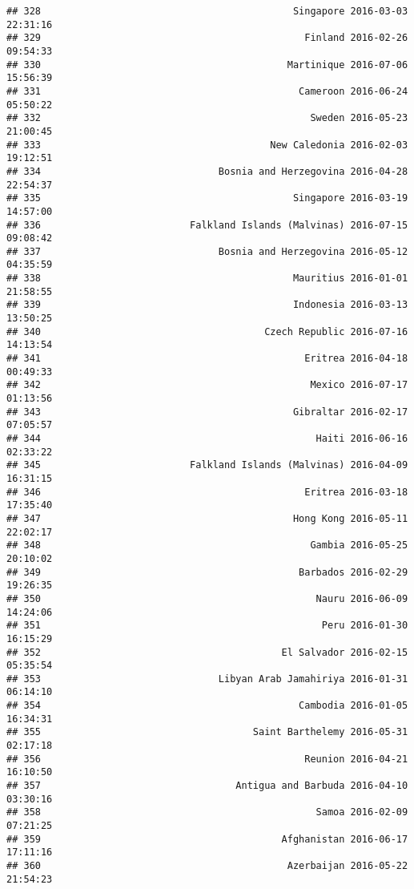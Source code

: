 \documentclass[
]{article}
\begin{document}
\begin{verbatim}
## 328                                            Singapore 2016-03-03 22:31:16
## 329                                              Finland 2016-02-26 09:54:33
## 330                                           Martinique 2016-07-06 15:56:39
## 331                                             Cameroon 2016-06-24 05:50:22
## 332                                               Sweden 2016-05-23 21:00:45
## 333                                        New Caledonia 2016-02-03 19:12:51
## 334                               Bosnia and Herzegovina 2016-04-28 22:54:37
## 335                                            Singapore 2016-03-19 14:57:00
## 336                          Falkland Islands (Malvinas) 2016-07-15 09:08:42
## 337                               Bosnia and Herzegovina 2016-05-12 04:35:59
## 338                                            Mauritius 2016-01-01 21:58:55
## 339                                            Indonesia 2016-03-13 13:50:25
## 340                                       Czech Republic 2016-07-16 14:13:54
## 341                                              Eritrea 2016-04-18 00:49:33
## 342                                               Mexico 2016-07-17 01:13:56
## 343                                            Gibraltar 2016-02-17 07:05:57
## 344                                                Haiti 2016-06-16 02:33:22
## 345                          Falkland Islands (Malvinas) 2016-04-09 16:31:15
## 346                                              Eritrea 2016-03-18 17:35:40
## 347                                            Hong Kong 2016-05-11 22:02:17
## 348                                               Gambia 2016-05-25 20:10:02
## 349                                             Barbados 2016-02-29 19:26:35
## 350                                                Nauru 2016-06-09 14:24:06
## 351                                                 Peru 2016-01-30 16:15:29
## 352                                          El Salvador 2016-02-15 05:35:54
## 353                               Libyan Arab Jamahiriya 2016-01-31 06:14:10
## 354                                             Cambodia 2016-01-05 16:34:31
## 355                                     Saint Barthelemy 2016-05-31 02:17:18
## 356                                              Reunion 2016-04-21 16:10:50
## 357                                  Antigua and Barbuda 2016-04-10 03:30:16
## 358                                                Samoa 2016-02-09 07:21:25
## 359                                          Afghanistan 2016-06-17 17:11:16
## 360                                           Azerbaijan 2016-05-22 21:54:23

\end{verbatim}
\end{document}

